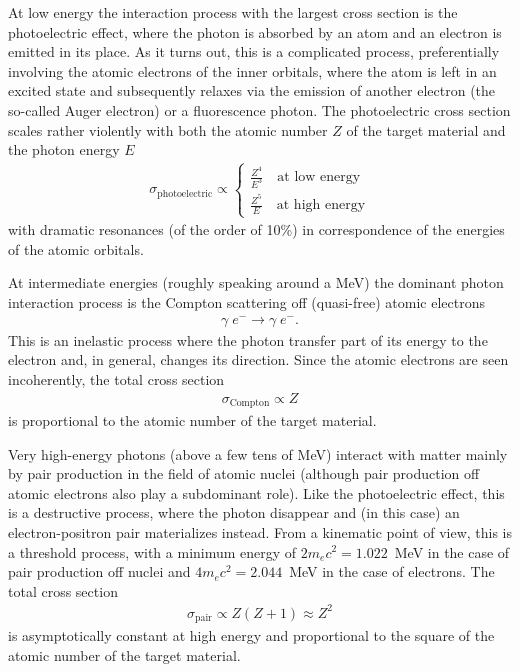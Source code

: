 At low energy the interaction process
with the largest cross section is the photoelectric effect, where the photon is
absorbed by an atom and an electron is emitted in its place. As it turns out, this
is a complicated process, preferentially involving the atomic electrons of the
inner orbitals, where the atom is left in an excited state and subsequently relaxes
via the emission of another electron (the so-called Auger electron) or a fluorescence
photon. The photoelectric cross section scales rather violently with both the
atomic number $Z$ of the target material and the photon energy $E$
\begin{align}
  \sigma_\text{photoelectric} \propto
  \begin{cases}
    \displaystyle\frac{Z^4}{E^3} \quad\text{at low energy}\\[8pt]
    \displaystyle\frac{Z^5}{E} \quad\text{at high energy}
  \end{cases}
\end{align}
with dramatic resonances (of the order of 10\%) in correspondence of the energies
of the atomic orbitals.

At intermediate energies (roughly speaking around a MeV) the dominant photon
interaction process is the Compton scattering off (quasi-free) atomic electrons
\begin{align}
  \gamma \; e^- \rightarrow \gamma \; e^-.
\end{align}
This is an inelastic process where the photon transfer part of its energy to the
electron and, in general, changes its direction. Since the atomic electrons are
seen incoherently, the total cross section
\begin{align}
  \sigma_\text{Compton} \propto Z
\end{align}
is proportional to the atomic number of the target material.

Very high-energy photons (above a few tens of MeV) interact with matter mainly by
pair production in the field of atomic nuclei (although pair production off
atomic electrons also play a subdominant role). Like the photoelectric effect, this
is a destructive process, where the photon disappear and (in this case) an
electron-positron pair materializes instead. From a kinematic point of view,
this is a threshold process, with a minimum energy of $2 m_e c^2 = 1.022$~MeV
in the case of pair production off nuclei and $4 m_e c^2 = 2.044$~MeV in the
case of electrons. The total cross section
\begin{align}
  \sigma_\text{pair} \propto Z(Z + 1) \approx Z^2
\end{align}
is asymptotically constant at high energy and proportional to the square of the
atomic number of the target material.


